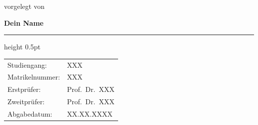\begin{titlepage}
\begin{singlespacing}
\begin{center}
      \vspace{1.4cm}

      {\normalsize\color{black!65} vorgelegt von}\\[0.28cm]
      {\fontsize{15}{19}\selectfont\bfseries Dein Name\par} %
    \end{center}


    {\color{black!25}\hrule height 0.5pt}
    \vspace{0.65cm}

    \noindent
    \renewcommand{\arraystretch}{1.35}
    \begin{tabularx}{\textwidth}{@{}p{3.8cm} X@{}}
      \textcolor{black!70}{Studiengang:}    & XXX \\                %
      \textcolor{black!70}{Matrikelnummer:} & XXX \\[0.45cm]        %
      \textcolor{black!70}{Erstprüfer:}     & Prof.\ Dr.\ XXX \\    %
      \textcolor{black!70}{Zweitprüfer:}    & Prof.\ Dr.\ XXX \\    %
      \textcolor{black!70}{Abgabedatum:}    & XX.XX.XXXX \\         %
    \end{tabularx}

    \vspace*{0.2cm}
  \end{singlespacing}
\end{titlepage}
